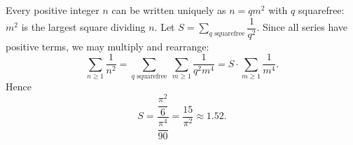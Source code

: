 Every positive integer $n$ can be written uniquely as $n=qm^2$ with $q$ squarefree: $m^2$ is the largest square dividing $n$. Let $S=\displaystyle\sum_{q\text{ squarefree}}\dfrac1{q^2}$. Since all series have positive terms, we may multiply and rearrange:
\[\sum_{n\ge1}\dfrac1{n^2}=\sum_{q\text{ squarefree}}\ \sum_{m\ge1}\dfrac{1}{q^2m^4}=S\cdot\sum_{m\ge1}\dfrac1{m^4}.\]
Hence
\[S=\dfrac{\dfrac{\pi^2}{6}}{\dfrac{\pi^4}{90}}=\boxed{\dfrac{15}{\pi^2}}\approx1.52.\]
